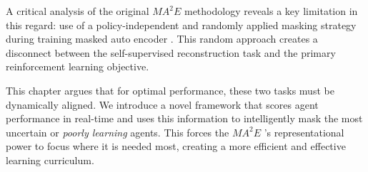 A critical analysis of the original ${MA}^2E$  methodology reveals a key limitation in this regard: use of a policy-independent and randomly applied masking strategy during  training masked auto encoder . This random approach creates a disconnect between the self-supervised reconstruction task and the primary reinforcement learning objective.

This chapter argues that for optimal performance, these two tasks must be dynamically aligned. We introduce a novel framework that scores agent performance in real-time and uses this information to intelligently mask the most uncertain or \textit{poorly learning} agents. This forces the ${MA}^2E$ 's representational power to focus where it is needed most, creating a more efficient and effective learning curriculum.

